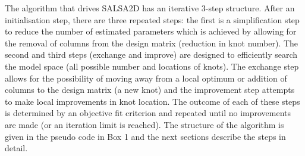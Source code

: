 \documentclass[letterpaper, 12pt]{interact}
\begin{document}
	The algorithm that drives SALSA2D has an iterative 3-step structure. After an initialisation step, there are three repeated steps: the first is a simplification step to reduce the number of estimated parameters which is achieved by allowing for the removal of columns from the design matrix (reduction in knot number). The second and third steps (exchange and improve) are designed to efficiently search the model space (all possible number and locations of knots). The exchange step allows for the possibility of moving away from a local optimum or addition of columns to the design matrix (a new knot) and the improvement step attempts to make local improvements in knot location. The outcome of each of these steps is determined by an objective fit criterion and repeated until no improvements are made (or an iteration limit is reached). The structure of the algorithm is given in the pseudo code in Box 1 and the next sections describe the steps in detail.
	
	\vspace{1cm}
	
	\begin{InfoBox}
	\end{InfoBox}
	
\end{document}
